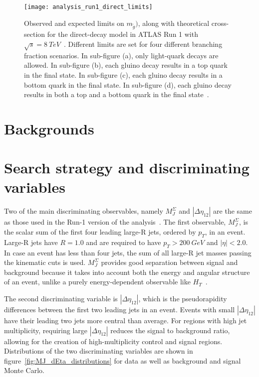 \begin{figure}[!ht]\centering
    \texttt{[image: analysis\_run1\_direct\_limits]}
    \caption{Observed and expected limits on $m_{\tilde{g}})$, along with theoretical cross-section for the direct-decay model in ATLAS Run 1 with $\sqrt{s}=8~TeV$~\cite{run1-multijet}.
    Different limits are set for four different branching fraction scenarios.
    In sub-figure (a), only light-quark decays are allowed.
    In sub-figure (b), each gluino decay results in a top quark in the final state.
    In sub-figure (c), each gluino decay results in a bottom quark in the final state.
    In sub-figure (d), each gluino decay results in both a top and a bottom quark in the final state~\cite{run1-multijet}.}
    \label{fig:run1_direct_limits}
\end{figure}

\section{Backgrounds}\label{sec:backgrounds}

\section{Search strategy and discriminating variables}\label{sec:search_strategy}

Two of the main discriminating observables, namely $M_J^{\Sigma}$ and $|\Delta\eta_{12}|$ are the same as those used in the Run-1 version of the analysis~\cite{run1-multijet}.
The first observable, $M_J^{\Sigma}$, is the scalar sum of the first four leading large-R jets, ordered by $p_{T}$, in an event.
Large-R jets have $R=1.0$ and are required to have $p_{T} > 200~GeV$ and $|\eta|<2.0$.
In case an event has less than four jets, the sum of all large-R jet masses passing the kinematic cuts is used.
$M_{J}^{\Sigma}$ provides good separation between signal and background because it takes into account both the energy and angular structure of an event, unlike a purely energy-dependent observable like $H_{T}$~\cite{hook-mj,elhedri-mj}.

The second discriminating variable is $|\Delta \eta_{12}|$, which is the pseudorapidity differences between the first two leading jets in an event.
Events with small $|\Delta \eta_{12}|$ have their leading two jets more central than average.
For regions with high jet multiplicity, requiring large $|\Delta \eta_{12}|$ reduces the signal to background ratio, allowing for the creation of high-multiplicity control and signal regions.
Distributions of the two discriminating variables are shown in figure~\ref{fig:MJ_dEta_distributions} for data as well as background and signal Monte Carlo.

